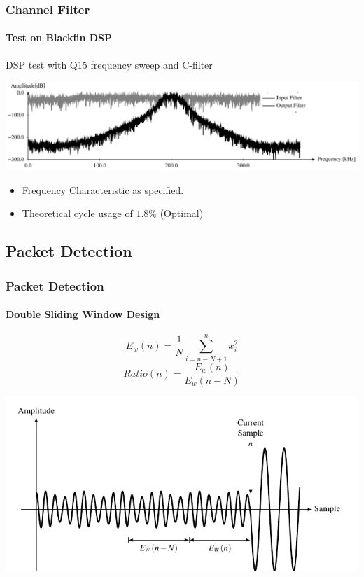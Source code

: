 \begin{frame} \frametitle{Channel Filter}
    \framesubtitle{Test on Blackfin DSP}
DSP test with Q15 frequency sweep and C-filter
    \begin{center}
        \includegraphics[width=\textwidth]{img/filter7_test_freq_res}
    \end{center}
\begin{itemize}
    \item Frequency Characteristic as specified.
    \item Theoretical cycle usage of $1.8\%$ (Optimal)
\end{itemize}
\end{frame}

\subsection{Packet Detection}
\begin{frame} \frametitle{Packet Detection}
    \framesubtitle{Double Sliding Window Design}
        \begin{equation*}
            E_w(n) = \frac{1}{N}\sum_{i=n-N+1}^{n} x_i^2
        \end{equation*}
        \begin{equation*}
            Ratio(n) = \frac{E_w(n)}{E_w(n-N)} 
        \end{equation*}
    \begin{center}
        \includegraphics[width=\textwidth]{img/dsw4}
    \end{center}

\end{frame}



